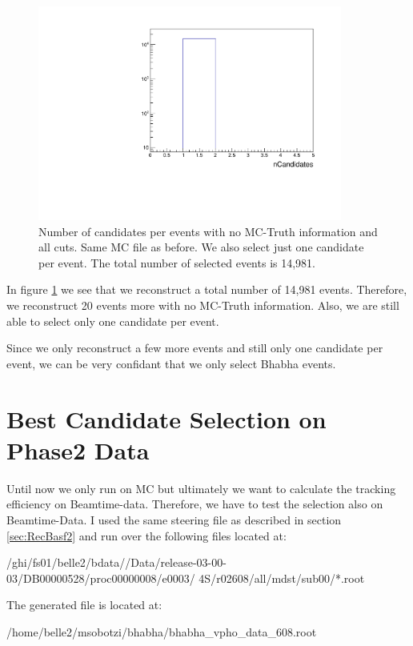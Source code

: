 \documentclass[a4paper,11pt,twosided,final,german,openbib,pdftex,listof=totoc,bibliography=totoc]{scrbook}
\begin{document}
\begin{figure}[h!]
	\centering
	\includegraphics[width=10cm]{Cuts/nCandNoMCInfo.pdf}
	\caption[Number Of Candidates Per Event With No MC-Truth Info (All Cuts)]{Number of candidates per events with no MC-Truth information and all cuts. Same MC file as before. We also select just one candidate per event. The total number of selected events is 14,981.}
	\label{fig:nCandNoMCInfo}
\end{figure}

In figure \ref{fig:nCandNoMCInfo} we see that we reconstruct a total number of 14,981 events. Therefore, we reconstruct 20 events more with no MC-Truth information. Also, we are still able to select only one candidate per event. 

Since we only reconstruct a few more events and still only one candidate per event, we can be very confidant that we only select Bhabha events.

\section{Best Candidate Selection on Phase2 Data}
\label{sec:SelectingBhabhaData}

Until now we only run on MC but ultimately we want to calculate the tracking efficiency on Beamtime-data. Therefore, we have to test the selection also on Beamtime-Data. I used the same steering file as described in section \ref{sec:RecBasf2} and run over the following files located at:
\newline

/ghi/fs01/belle2/bdata//Data/release-03-00-03/DB00000528/proc00000008/e0003/
4S/r02608/all/mdst/sub00/*.root
\newline

The generated file is located at:

/home/belle2/msobotzi/bhabha/bhabha\_vpho\_data\_608.root
\end{document}

